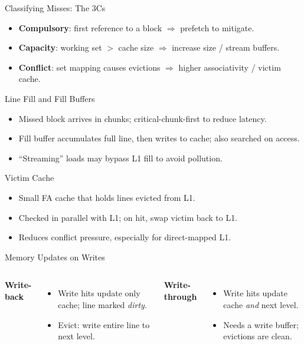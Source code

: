 \documentclass[aspectratio=169,12pt]{beamer}
\begin{document}
\begin{frame}{Classifying Misses: The 3Cs}
\begin{itemize}
  \item \textbf{Compulsory}: first reference to a block $\Rightarrow$ prefetch to mitigate.
  \item \textbf{Capacity}: working set $>$ cache size $\Rightarrow$ increase size / stream buffers.
  \item \textbf{Conflict}: set mapping causes evictions $\Rightarrow$ higher associativity / victim cache.
\end{itemize}
\end{frame}

\begin{frame}{Line Fill and Fill Buffers}
\begin{itemize}
  \item Missed block arrives in chunks; critical-chunk-first to reduce latency.
  \item Fill buffer accumulates full line, then writes to cache; also searched on access.
  \item ``Streaming'' loads may bypass L1 fill to avoid pollution.
\end{itemize}
\end{frame}

\begin{frame}{Victim Cache}
\begin{itemize}
  \item Small FA cache that holds lines evicted from L1.
  \item Checked in parallel with L1; on hit, swap victim back to L1.
  \item Reduces conflict pressure, especially for direct-mapped L1.
\end{itemize}
\end{frame}

\begin{frame}{Memory Updates on Writes}
\begin{columns}[T]
\textbf{Write-back}
\begin{itemize}
  \item Write hits update only cache; line marked \emph{dirty}.
  \item Evict: write entire line to next level.
\end{itemize}
\textbf{Write-through}
\begin{itemize}
  \item Write hits update cache \emph{and} next level.
  \item Needs a write buffer; evictions are clean.
\end{itemize}
\end{columns}
\end{frame}
\end{document}
